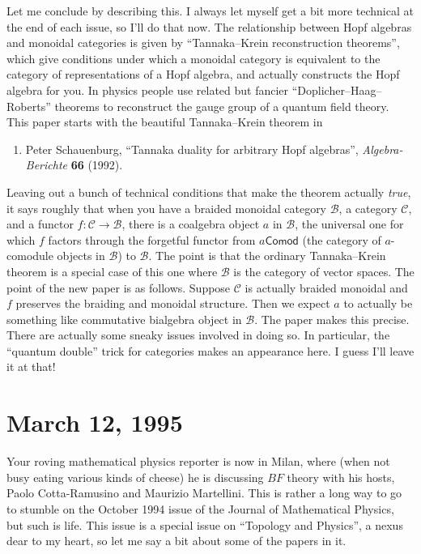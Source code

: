\documentclass{article}
\def\tightlist{}
\begin{document}
Let me conclude by describing this. I always let myself get a bit more
technical at the end of each issue, so I'll do that now. The
relationship between Hopf algebras and monoidal categories is given by
``Tannaka--Krein reconstruction theorems'', which give conditions under
which a monoidal category is equivalent to the category of
representations of a Hopf algebra, and actually constructs the Hopf
algebra for you. In physics people use related but fancier
``Doplicher--Haag--Roberts'' theorems to reconstruct the gauge group of a
quantum field theory. This paper starts with the beautiful Tannaka--Krein
theorem in

\begin{enumerate}
\def\labelenumi{\arabic{enumi})}
\setcounter{enumi}{4}
\tightlist
\item
  Peter Schauenburg, ``Tannaka duality for arbitrary Hopf algebras'', 
  \emph{Algebra-Berichte} \textbf{66} (1992).
\end{enumerate}

Leaving out a bunch of technical conditions that make the theorem
actually \emph{true}, it says roughly that when you have a braided monoidal
category \(\mathcal{B}\), a category \(\mathcal{C}\), and a functor
\(f\colon \mathcal{C} \to \mathcal{B}\), there is a coalgebra object
\(a\) in \(\mathcal{B}\), the universal one for which \(f\) factors
through the forgetful functor from \(a\mathsf{Comod}\) (the category of
\(a\)-comodule objects in \(\mathcal{B}\)) to \(\mathcal{B}\). The point
is that the ordinary Tannaka--Krein theorem is a special case of this one
where \(\mathcal{B}\) is the category of vector spaces. The point of the
new paper is as follows. Suppose \(\mathcal{C}\) is actually braided
monoidal and \(f\) preserves the braiding and monoidal structure. Then
we expect \(a\) to actually be something like commutative bialgebra
object in \(\mathcal{B}\). The paper makes this precise. There are
actually some sneaky issues involved in doing so. In particular, the
``quantum double'' trick for categories makes an appearance here. I
guess I'll leave it at that!



\hypertarget{week50}{%
\section{March 12, 1995}\label{week50}}

Your roving mathematical physics reporter is now in Milan, where (when
not busy eating various kinds of cheese) he is discussing \(BF\) theory
with his hosts, Paolo Cotta-Ramusino and Maurizio Martellini. This is
rather a long way to go to stumble on the October 1994 issue of the
Journal of Mathematical Physics, but such is life. This issue is a
special issue on ``Topology and Physics'', a nexus dear to my heart, so
let me say a bit about some of the papers in it.
\end{document}

